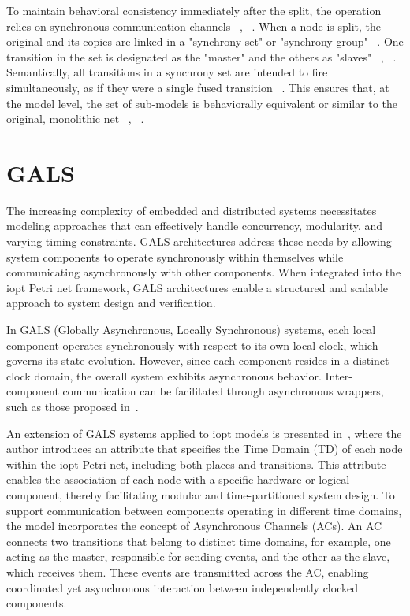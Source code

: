 \begin{itemize}
To maintain behavioral consistency immediately after the split, the operation relies on synchronous communication channels ~\cite{splitting}, ~\cite{co-design}. When a node is split, the original and its copies are linked in a "synchrony set" or "synchrony group" ~\cite{co-design}. One transition in the set is designated as the "master" and the others as "slaves" ~\cite{splitting}, ~\cite{co-design}. Semantically, all transitions in a synchrony set are intended to fire simultaneously, as if they were a single fused transition ~\cite{splitting}. This ensures that, at the model level, the set of sub-models is behaviorally equivalent or similar to the original, monolithic net ~\cite{splitting}, ~\cite{co-design}.

\end{itemize}



\section{GALS}
\label{sec:gals}


The increasing complexity of embedded and distributed systems necessitates modeling approaches that can effectively handle concurrency, modularity, and varying timing constraints. GALS architectures address these needs by allowing system components to operate synchronously within themselves while communicating asynchronously with other components. When integrated into the \gls{iopt} Petri net framework, GALS architectures enable a structured and scalable approach to system design and verification.

In GALS (Globally Asynchronous, Locally Synchronous) systems, each local component operates synchronously with respect to its own local clock, which governs its state evolution. However, since each component resides in a distinct clock domain, the overall system exhibits asynchronous behavior. Inter-component communication can be facilitated through asynchronous wrappers, such as those proposed in~\cite{galsborman}.


An extension of GALS systems applied to \gls{iopt} models is presented in~\cite{galsactd}, where the author introduces an attribute that specifies the Time Domain (TD) of each node within the \gls{iopt} Petri net, including both places and transitions. This attribute enables the association of each node with a specific hardware or logical component, thereby facilitating modular and time-partitioned system design.
To support communication between components operating in different time domains, the model incorporates the concept of Asynchronous Channels (ACs). An AC connects two transitions that belong to distinct time domains, for example, one acting as the master, responsible for sending events, and the other as the slave, which receives them. These events are transmitted across the AC, enabling coordinated yet asynchronous interaction between independently clocked components.


